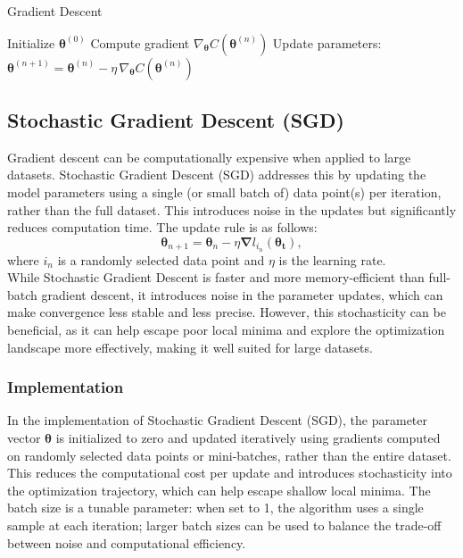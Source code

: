 \documentclass[
    article
 reprint,            %
 amsmath,amssymb,
 aps,
]{revtex4-2}
\begin{document}
\begin{algorithm}[H]
\caption{Gradient Descent}
\begin{algorithmic}[1]
\State Initialize $\boldsymbol{\theta}^{(0)}$
    \State Compute gradient $\nabla_{\boldsymbol{\theta}} C(\boldsymbol{\theta}^{(n)})$
    \State Update parameters: 
    $\boldsymbol{\theta}^{(n+1)} = \boldsymbol{\theta}^{(n)} - \eta \, \nabla_{\boldsymbol{\theta}} C(\boldsymbol{\theta}^{(n)})$
\EndFor
\end{algorithmic}
\end{algorithm}

\subsection{Stochastic Gradient Descent (SGD)}
Gradient descent can be computationally expensive when applied to large datasets.
Stochastic Gradient Descent (SGD) addresses this by updating the model parameters using a single (or small batch of) data point(s) per iteration, rather than the full dataset\cite{hjorthjensen_week37}.
This introduces noise in the updates but significantly reduces computation time.
The update rule is as follows:  
$$
\boldsymbol{\theta}_{n+1} = \boldsymbol{\theta}_n - {\eta \boldsymbol{\nabla}} l_{i_n} (\boldsymbol{\theta_t}),
$$  
where \(i_n\) is a randomly selected data point and \(\eta\) is the learning rate. \\

While Stochastic Gradient Descent is faster and more memory-efficient than full-batch gradient descent, it introduces noise in the parameter updates, which can make convergence less stable and less precise. However, this stochasticity can be beneficial, as it can help escape poor local minima and explore the optimization landscape more effectively, making it well suited for large datasets. \cite{hjorthjensen_week37}

\subsubsection{Implementation}

In the implementation of Stochastic Gradient Descent (SGD), the parameter vector $\boldsymbol{\theta}$ is initialized to zero and updated iteratively using gradients computed on randomly selected data points or mini-batches, rather than the entire dataset. This reduces the computational cost per update and introduces stochasticity into the optimization trajectory, which can help escape shallow local minima. 
The batch size is a tunable parameter: when set to 1, the algorithm uses a single sample at each iteration; larger batch sizes can be used to balance the trade-off between noise and computational efficiency.
\end{document}
